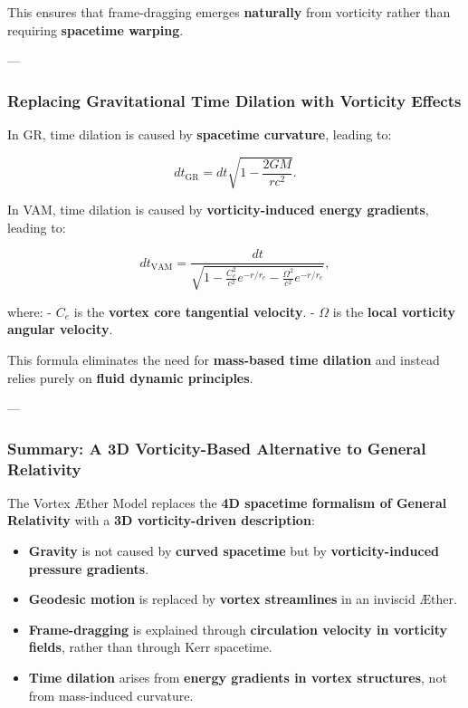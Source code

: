 This ensures that frame-dragging emerges \textbf{naturally} from vorticity rather than requiring \textbf{spacetime warping}.

---

\subsubsection*{Replacing Gravitational Time Dilation with Vorticity Effects}

In GR, time dilation is caused by \textbf{spacetime curvature}, leading to:

\begin{equation*}
    dt_\text{GR} = dt \sqrt{1 - \frac{2GM}{rc^2}}.
\end{equation*}

In VAM, time dilation is caused by \textbf{vorticity-induced energy gradients}, leading to:

\begin{equation*}
    dt_\text{VAM} = \frac{dt}{\sqrt{1 - \frac{C_e^2}{c^2} e^{-r/r_c} - \frac{\Omega^2}{c^2} e^{-r/r_c}}},
\end{equation*}

where:
- \( C_e \) is the \textbf{vortex core tangential velocity}.
- \( \Omega \) is the \textbf{local vorticity angular velocity}.

This formula eliminates the need for \textbf{mass-based time dilation} and instead relies purely on \textbf{fluid dynamic principles}.

---

\subsubsection*{Summary: A 3D Vorticity-Based Alternative to General Relativity}

The Vortex Æther Model replaces the \textbf{4D spacetime formalism of General Relativity} with a \textbf{3D vorticity-driven description}:

\begin{itemize}
    \item \textbf{Gravity} is not caused by \textbf{curved spacetime} but by \textbf{vorticity-induced pressure gradients}.
    \item \textbf{Geodesic motion} is replaced by \textbf{vortex streamlines} in an inviscid Æther.
    \item \textbf{Frame-dragging} is explained through \textbf{circulation velocity in vorticity fields}, rather than through Kerr spacetime.
    \item \textbf{Time dilation} arises from \textbf{energy gradients in vortex structures}, not from mass-induced curvature.
\end{itemize}
